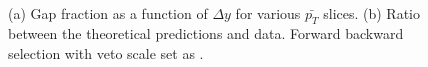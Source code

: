 %


\begin{figure}
\centering
\mbox{
              \quad
              \quad
}
\caption[Gap fraction as a function of $\Delta y$ for forward backward selection and variable $Q_0$]{ 
(a) Gap fraction as a function of $\Delta y$ for various $\bar{p_T}$ slices. (b) Ratio between the theoretical predictions and data. Forward backward selection with veto scale set as \ptb{}.
\label{GBJ1:pTSelBQ0}}
\end{figure}

